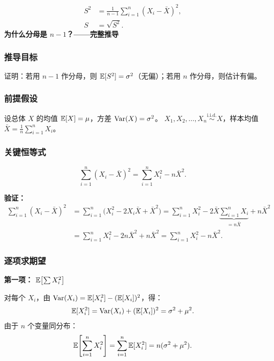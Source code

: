 \begin{definition}[样本方差与样本标准差]
\begin{align}
    S^2     &= \frac{1}{n-1} \sum_{i=1}^{n} (X_i - \bar{X})^2, \\
    S       &= \sqrt{S^2}.
\end{align}
\textbf{为什么分母是 $n-1$？——完整推导}
\end{definition}

\subsubsection{推导目标}

证明：若用 $n-1$ 作分母，则 $\mathbb{E}[S^2] = \sigma^2$（无偏）；若用 $n$ 作分母，则估计有偏。

\subsubsection{前提假设}

设总体 $X$ 的均值 $\mathbb{E}[X] = \mu$，方差 $\mathrm{Var}(X) = \sigma^2$。
$X_1, X_2, \dots, X_n \stackrel{\mathrm{i.i.d.}}{\sim} X$，样本均值 $\bar{X} = \frac{1}{n}\sum_{i=1}^{n} X_i$。

\subsubsection{关键恒等式}

\begin{equation}
    \sum_{i=1}^{n} (X_i - \bar{X})^2 = \sum_{i=1}^{n} X_i^2 - n\bar{X}^2.
    \label{eq:key-identity}
\end{equation}

\textbf{验证：}
\begin{align}
    \sum_{i=1}^{n} (X_i - \bar{X})^2
    &= \sum_{i=1}^{n} \big(X_i^2 - 2X_i\bar{X} + \bar{X}^2\big)
     = \sum_{i=1}^{n} X_i^2 - 2\bar{X}\underbrace{\sum_{i=1}^{n} X_i}_{= n\bar{X}} + n\bar{X}^2 \nonumber\\
    &= \sum_{i=1}^{n} X_i^2 - 2n\bar{X}^2 + n\bar{X}^2
     = \sum_{i=1}^{n} X_i^2 - n\bar{X}^2. \nonumber
\end{align}

\subsubsection{逐项求期望}

\textbf{第一项：} $\mathbb{E}\!\left[\sum X_i^2\right]$

对每个 $X_i$，由 $\mathrm{Var}(X_i) = \mathbb{E}[X_i^2] - (\mathbb{E}[X_i])^2$，得：
\begin{equation}
    \mathbb{E}[X_i^2] = \mathrm{Var}(X_i) + (\mathbb{E}[X_i])^2 = \sigma^2 + \mu^2.
\end{equation}
由于 $n$ 个变量同分布：
\begin{equation}
    \mathbb{E}\!\left[\sum_{i=1}^{n} X_i^2\right] = \sum_{i=1}^{n} \mathbb{E}[X_i^2]
    = n(\sigma^2 + \mu^2).
    \label{eq:term1}
\end{equation}

